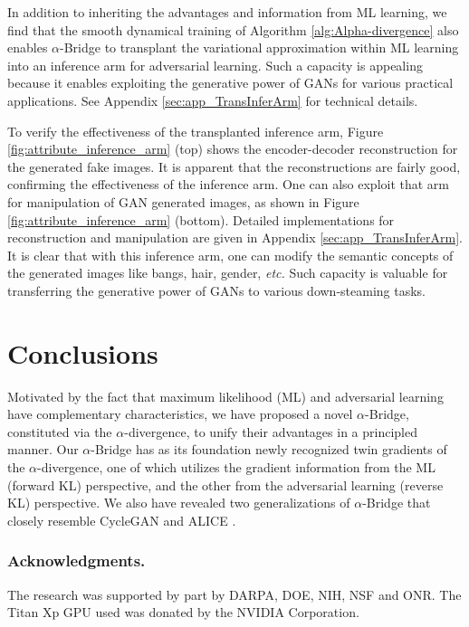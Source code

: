 \documentclass[letterpaper]{article} %
\newcommand{\etc}[0]{\emph{etc. }}
\begin{document}
In addition to inheriting the advantages and information from ML learning, we find that the smooth dynamical training of Algorithm \ref{alg:Alpha-divergence} also enables $\alpha$-Bridge to transplant the variational approximation within ML learning into an inference arm for adversarial learning. Such a capacity is  appealing because it enables exploiting the generative power of GANs for various practical applications.
See
Appendix \ref{sec:app_TransInferArm}
for technical details.


To verify the effectiveness of the transplanted inference arm, Figure \ref{fig:attribute_inference_arm} (top) shows the encoder-decoder reconstruction for the generated fake images. It is apparent that the reconstructions are fairly good, confirming the effectiveness of the inference arm.
One can also exploit that arm for manipulation of GAN generated images, as shown in Figure \ref{fig:attribute_inference_arm} (bottom). Detailed implementations for reconstruction and manipulation are given in
Appendix \ref{sec:app_TransInferArm}.
It is clear that with this inference arm, one can modify the semantic concepts of the generated images like bangs, hair, gender, \etc Such capacity is valuable for transferring the generative power of GANs to various down-steaming tasks.



\section{Conclusions}


Motivated by the fact that maximum likelihood (ML) and adversarial learning have complementary characteristics, we have proposed a novel $\alpha$-Bridge, constituted via the $\alpha$-divergence, to unify their advantages in a principled manner.
Our $\alpha$-Bridge has as its foundation newly recognized twin gradients of the $\alpha$-divergence, one of which utilizes the gradient information from the ML (forward KL) perspective, and the other from the adversarial learning (reverse KL) perspective.
We also have revealed two generalizations of $\alpha$-Bridge
that closely resemble CycleGAN \cite{zhu2017unpaired} and ALICE \cite{li2017alice}.


\subsubsection{Acknowledgments.} The research was supported by part by DARPA, DOE, NIH, NSF and ONR. The Titan Xp GPU used was donated by the NVIDIA Corporation.
\end{document}
